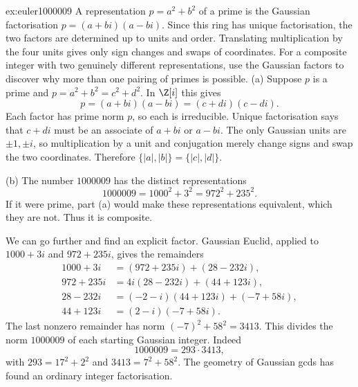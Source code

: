 \begin{solution}{ex:euler1000009}
\idea A representation $p=a^2+b^2$ of a prime is the Gaussian factorisation $p=(a+bi)(a-bi)$. Since this ring has unique factorisation, the two factors are determined up to units and order. Translating multiplication by the four units gives only sign changes and swaps of coordinates. For a composite integer with two genuinely different representations, use the Gaussian factors to discover why more than one pairing of primes is possible.
\writeup (a) Suppose $p$ is a prime and
$p=a^2+b^2=c^2+d^2$. In $\Z[i]$ this gives
\[
p=(a+bi)(a-bi)=(c+di)(c-di).
\]
Each factor has prime norm $p$, so each is irreducible. Unique factorisation says that $c+di$ must be an associate of $a+bi$ or $a-bi$. The only Gaussian units are $\pm1,\pm i$, so multiplication by a unit and conjugation merely change signs and swap the two coordinates. Therefore $\{|a|,|b|\}=\{|c|,|d|\}$.

(b) The number $1000009$ has the distinct representations
\[
1000009=1000^2+3^2=972^2+235^2.
\]
If it were prime, part (a) would make these representations equivalent, which they are not. Thus it is composite.

We can go further and find an explicit factor. Gaussian Euclid, applied to $1000+3i$ and $972+235i$, gives the remainders
\[
\begin{aligned}
1000+3i&=(972+235i)+(28-232i),\\
972+235i&=4i(28-232i)+(44+123i),\\
28-232i&=(-2-i)(44+123i)+(-7+58i),\\
44+123i&=(2-i)(-7+58i).
\end{aligned}
\]
The last nonzero remainder has norm $(-7)^2+58^2=3413$. This divides the norm $1000009$ of each starting Gaussian integer. Indeed
\[
1000009=293\cdot3413,
\]
with $293=17^2+2^2$ and $3413=7^2+58^2$. The geometry of Gaussian gcds has found an ordinary integer factorisation.
\end{solution}

